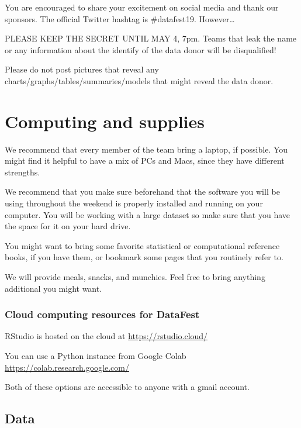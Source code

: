 \documentclass[]{article}
\begin{document}
You are encouraged to share your excitement on social media and thank
our sponsors. The official Twitter hashtag is \#datafest19.
However\ldots{}

PLEASE KEEP THE SECRET UNTIL MAY 4, 7pm. Teams that leak the name or any
information about the identify of the data donor will be disqualified!

Please do not post pictures that reveal any
charts/graphs/tables/summaries/models that might reveal the data donor.

\hypertarget{computing-and-supplies}{%
\section{Computing and supplies}\label{computing-and-supplies}}

We recommend that every member of the team bring a laptop, if possible.
You might find it helpful to have a mix of PCs and Macs, since they have
different strengths.

We recommend that you make sure beforehand that the software you will be
using throughout the weekend is properly installed and running on your
computer. You will be working with a large dataset so make sure that you
have the space for it on your hard drive.

You might want to bring some favorite statistical or computational
reference books, if you have them, or bookmark some pages that you
routinely refer to.

We will provide meals, snacks, and munchies. Feel free to bring anything
additional you might want.

\hypertarget{cloud-computing-resources-for-datafest}{%
\subsubsection{Cloud computing resources for
DataFest}\label{cloud-computing-resources-for-datafest}}

RStudio is hosted on the cloud at \url{https://rstudio.cloud/}

You can use a Python instance from Google Colab
\url{https://colab.research.google.com/}

Both of these options are accessible to anyone with a gmail account.

\hypertarget{data}{%
\subsection{Data}\label{data}}
\end{document}
